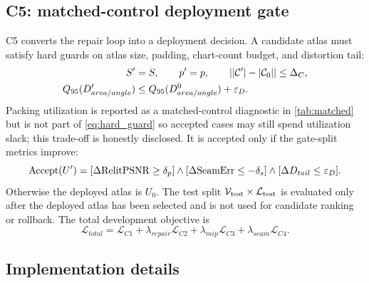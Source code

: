 \subsection{C5: matched-control deployment gate}
\label{sec:c5}

C5 converts the repair loop into a deployment decision. A candidate atlas must satisfy hard guards on atlas size, padding, chart-count budget, and distortion tail:
\begin{equation}
\begin{aligned}
S' &= S,\qquad p'=p,\qquad \lvert |\mathcal{C}'|-|\mathcal{C}_0| \rvert \le \Delta_C,\\
Q_{95}(D'_{area/angle}) &\le Q_{95}(D^0_{area/angle})+\varepsilon_D .
\end{aligned}
\label{eq:hard_guard}
\end{equation}
Packing utilization is reported as a matched-control diagnostic in \cref{tab:matched} but is not part of \cref{eq:hard_guard} so accepted cases may still spend utilization slack; this trade-off is honestly disclosed.
It is accepted only if the gate-split metrics improve:
\begin{equation}
\mathrm{Accept}(U')=
[\Delta\mathrm{Relit}\mathrm{PSNR}\ge\delta_p]\land
[\Delta\mathrm{SeamErr}\le-\delta_s]\land
[\Delta D_{tail}\le\varepsilon_D].
\label{eq:accept}
\end{equation}
Otherwise the deployed atlas is \(U_0\). The test split \(\mathcal{V}_{\mathrm{test}}\times\mathcal{L}_{\mathrm{test}}\) is evaluated only after the deployed atlas has been selected and is not used for candidate ranking or rollback. The total development objective is
\begin{equation}
\mathcal{L}_{total}=
\mathcal{L}_{C1}
+\lambda_{repair}\mathcal{L}_{C2}
+\lambda_{mip}\mathcal{L}_{C3}
+\lambda_{seam}\mathcal{L}_{C4}.
\label{eq:total}
\end{equation}

\subsection{Implementation details}
\label{sec:implementation}

